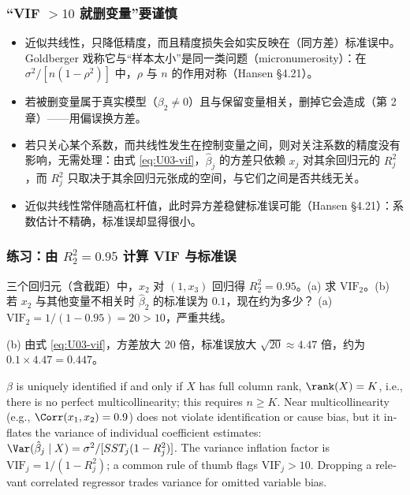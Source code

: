 \subsubsection{“VIF \texorpdfstring{$>10$}{> 10} 就删变量”要谨慎}

\begin{note}
\begin{itemize}
  \item 近似共线性，只降低精度，而且精度损失会如实反映在（同方差）标准误中。Goldberger 戏称它与“样本太小”是同一类问题（micronumerosity）：在 $\sigma^2/[n(1-\rho^2)]$ 中，$\rho$ 与 $n$ 的作用对称（Hansen §4.21）。
  \item 若被删变量属于真实模型（$\beta_2\neq0$）且与保留变量相关，删掉它会造成（第 2 章）——用偏误换方差。
  \item 若只关心某个系数，而共线性发生在控制变量之间，则对关注系数的精度没有影响，无需处理：由式 \eqref{eq:U03-vif}，$\hat\beta_j$ 的方差只依赖 $x_j$ 对其余回归元的 $R_j^2$，而 $R_j^2$ 只取决于其余回归元张成的空间，与它们之间是否共线无关。
  \item 近似共线性常伴随高杠杆值，此时异方差稳健标准误可能（Hansen §4.21）：系数估计不精确，标准误却显得很小。
\end{itemize}
\end{note}

\subsubsection{练习：由 \texorpdfstring{$R_2^2=0.95$}{R\_2\^{}2 = 0.95} 计算 VIF 与标准误}

\begin{prac}
三个回归元（含截距）中，$x_2$ 对 $(1,x_3)$ 回归得 $R_2^2=0.95$。(a) 求 $\mathrm{VIF}_2$。(b) 若 $x_2$ 与其他变量不相关时 $\hat\beta_2$ 的标准误为 $0.1$，现在约为多少？
\answer
(a) $\mathrm{VIF}_2=1/(1-0.95)=20>10$，严重共线。

(b) 由式 \eqref{eq:U03-vif}，方差放大 20 倍，标准误放大 $\sqrt{20}\approx4.47$ 倍，约为 $0.1\times4.47=0.447$。
\end{prac}

\begin{english}
$\beta$ is uniquely identified if and only if $X$ has full column rank, $\rank(X)=K$, i.e., there is no perfect multicollinearity; this requires $n\ge K$. Near multicollinearity (e.g., $\Corr(x_1,x_2)=0.9$) does not violate identification or cause bias, but it inflates the variance of individual coefficient estimates: $\Var(\hat\beta_j\mid X)=\sigma^2/[SST_j(1-R_j^2)]$. The variance inflation factor is $\mathrm{VIF}_j=1/(1-R_j^2)$; a common rule of thumb flags $\mathrm{VIF}_j>10$. Dropping a relevant correlated regressor trades variance for omitted variable bias.
\end{english}


